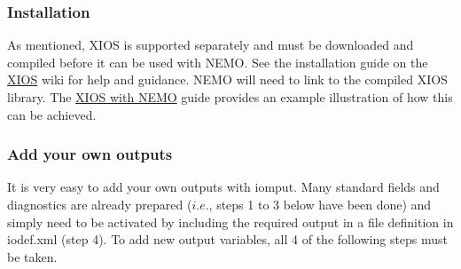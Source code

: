 \documentclass[../tex_main/NEMO_manual]{subfiles}
\begin{document}
\subsubsection{Installation}

As mentioned, XIOS is supported separately and must be downloaded and compiled before 
it can be used with NEMO.
See the installation guide on the \href{http://forge.ipsl.jussieu.fr/ioserver/wiki}{XIOS} wiki for 
help and guidance.
NEMO will need to link to the compiled XIOS library.
The 
\href{https://forge.ipsl.jussieu.fr/nemo/wiki/Users/ModelInterfacing/InputsOutputs#Inputs-OutputsusingXIOS}
{XIOS with NEMO}
guide provides an example illustration of how this can be achieved.

\subsubsection{Add your own outputs}

It is very easy to add your own outputs with iomput.
Many standard fields and diagnostics are already prepared ($i.e.$, steps 1 to 3 below have been done) and 
simply need to be activated by including the required output in a file definition in iodef.xml (step 4).
To add new output variables, all 4 of the following steps must be taken.
\end{document}
